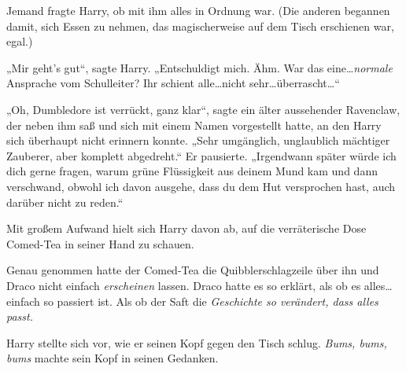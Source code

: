 Jemand fragte Harry, ob mit ihm alles in Ordnung war. (Die anderen begannen damit, sich Essen zu nehmen, das magischerweise auf dem Tisch erschienen war, egal.)

„Mir geht’s gut“, sagte Harry. „Entschuldigt mich. Ähm. War das eine…\emph{normale} Ansprache vom Schulleiter? Ihr schient alle…nicht sehr…überrascht…“

„Oh, Dumbledore ist verrückt, ganz klar“, sagte ein älter aussehender Ravenclaw, der neben ihm saß und sich mit einem Namen vorgestellt hatte, an den Harry sich überhaupt nicht erinnern konnte. „Sehr umgänglich, unglaublich mächtiger Zauberer, aber komplett abgedreht.“ Er pausierte. „Irgendwann später würde ich dich gerne fragen, warum grüne Flüssigkeit aus deinem Mund kam und dann verschwand, obwohl ich davon ausgehe, dass du dem Hut versprochen hast, auch darüber nicht zu reden.“

Mit großem Aufwand hielt sich Harry davon ab, auf die verräterische Dose Comed-Tea in seiner Hand zu schauen.

Genau genommen hatte der Comed-Tea die Quibblerschlagzeile über ihn und Draco nicht einfach \emph{erscheinen} lassen. Draco hatte es so erklärt, als ob es alles…einfach so passiert ist. Als ob der Saft die \emph{Geschichte so verändert, dass alles passt.}

Harry stellte sich vor, wie er seinen Kopf gegen den Tisch schlug. \emph{Bums, bums, bums} machte sein Kopf in seinen Gedanken.

